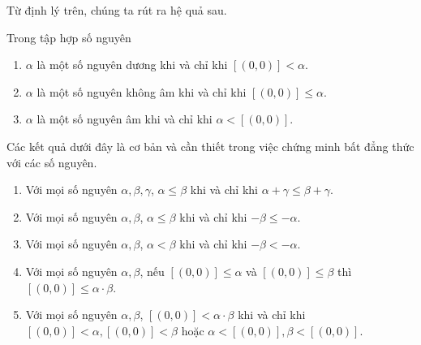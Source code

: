 Từ định lý trên, chúng ta rút ra hệ quả sau.
\begin{corollary}\label{corollary:positive-nonnegative-negative-precise-condition}
	Trong tập hợp số nguyên
	\begin{enumerate}[label={(\roman*)}]
		\item $\alpha$ là một số nguyên dương khi và chỉ khi $[(0,0)] < \alpha$.
		\item $\alpha$ là một số nguyên không âm khi và chỉ khi $[(0,0)] \leq \alpha$.
		\item $\alpha$ là một số nguyên âm khi và chỉ khi $\alpha < [(0,0)]$.
	\end{enumerate}
\end{corollary}

Các kết quả dưới đây là cơ bản và cần thiết trong việc chứng minh bất đẳng thức với các số nguyên.

\begin{theorem}\label{theorem:integers-order-and-operations}
	\begin{enumerate}[label={(\roman*)}]
		\item Với mọi số nguyên $\alpha, \beta, \gamma$, $\alpha\leq \beta$ khi và chỉ khi $\alpha + \gamma\leq \beta + \gamma$.
		\item Với mọi số nguyên $\alpha, \beta$, $\alpha\leq \beta$ khi và chỉ khi $-\beta\leq-\alpha$.
		\item Với mọi số nguyên $\alpha, \beta$, $\alpha < \beta$ khi và chỉ khi $-\beta < -\alpha$.
		\item Với mọi số nguyên $\alpha, \beta$, nếu $[(0,0)]\leq \alpha$ và $[(0,0)]\leq \beta$ thì $[(0,0)]\leq \alpha\cdot \beta$.
		\item Với mọi số nguyên $\alpha, \beta$, $[(0,0)] < \alpha\cdot \beta$ khi và chỉ khi $[(0,0)] < \alpha, [(0,0)] < \beta$ hoặc $\alpha < [(0,0)], \beta < [(0,0)]$.
	\end{enumerate}
\end{theorem}

